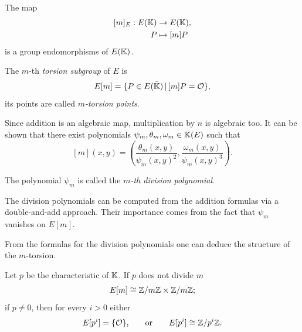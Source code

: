 The map
\begin{equation}
  \label{eq:122}
  \begin{aligned}[]
    [m]_E : E(\K) &\ra E(\K)\text{,}\\
    P &\mapsto [m]P
  \end{aligned}
\end{equation}
is a group endomorphisms of $E(\mathbb{K})$. 

\begin{definition}
  The $m$-th \emph{torsion subgroup} of $E$ is
  \begin{equation}
    \label{eq:123}
    E[m] = \{P\in E(\bar{\mathbb{K}}) \,|\, [m]P=\mathcal{O}\}
    \text{,}
  \end{equation}
  its points are called
  \emph{$m$-torsion
    points}.
\end{definition}

Since addition is an algebraic map, multiplication by $n$ is algebraic
too. It can be shown that there exist polynomials
$\psi_m,\theta_m,\omega_m\in\mathbb{K}(E)$ such that
\begin{equation}
  \label{eq:124}
  [m](x,y) = \left(\frac{\theta_m(x,y)}{\psi_m(x,y)^2},
    \frac{\omega_m(x,y)}{\psi_m(x,y)^3}\right)
  \text{.}
\end{equation}

\begin{definition}
  The polynomial $\psi_m$ is called the
  \emph{$m$-th division polynomial}.
\end{definition}

\begin{remark}
  The division polynomials can be computed from the addition formulas
  via a double-and-add approach. Their importance comes from the fact
  that $\psi_m$ vanishes on $E[m]$.
\end{remark}

From the formulas for the division polynomials one can deduce the
structure of the $m$-torsion.

\begin{theorem}
  Let $p$ be the characteristic of $\mathbb{K}$. If $p$ does not divide $m$
  \begin{equation}
    \label{eq:126}
    E[m] \cong \mathbb{Z}/m\mathbb{Z}\times\mathbb{Z}/m\mathbb{Z}
    \text{;}
  \end{equation}
  if $p\ne0$, then for every $i>0$ either
  \begin{equation}
    \label{eq:127}
    E[p^i] = \{\mathcal{O}\}\text{,} 
    \qquad\text{or}\qquad E[p^i] \cong \mathbb{Z}/p^i\mathbb{Z}
    \text{.}
  \end{equation}
\end{theorem}

